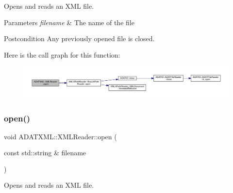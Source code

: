 Opens and reads an X\+ML file. 


\begin{DoxyParams}{Parameters}
{\em filename} & The name of the file \\
\hline
\end{DoxyParams}
\begin{DoxyPostcond}{Postcondition}
Any previously opened file is closed. 
\end{DoxyPostcond}
Here is the call graph for this function\+:
\nopagebreak
\begin{figure}[H]
\begin{center}
\leavevmode
\includegraphics[width=350pt]{db/d3f/classADATXML_1_1XMLReader_ad5dcbd08800bc67ac4a91f93cb1504b0_cgraph}
\end{center}
\end{figure}
\mbox{\label{classADATXML_1_1XMLReader_ad5dcbd08800bc67ac4a91f93cb1504b0}} 
\subsubsection{\texorpdfstring{open()}{open()}\hspace{0.1cm}{\footnotesize\ttfamily [3/9]}}
{\footnotesize\ttfamily void A\+D\+A\+T\+X\+M\+L\+::\+X\+M\+L\+Reader\+::open (\begin{DoxyParamCaption}\item[{const std\+::string \&}]{filename }\end{DoxyParamCaption})\hspace{0.3cm}{\ttfamily [inline]}}



Opens and reads an X\+ML file. 



